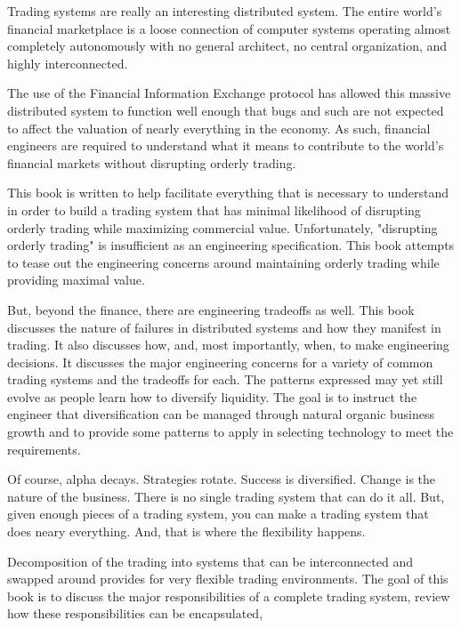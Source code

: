 Trading systems are really an interesting distributed system.  The entire world's
financial marketplace is a loose connection of computer systems operating almost
completely autonomously with no general architect, no central organization, and
highly interconnected.

The use of the Financial Information Exchange protocol has allowed this massive
distributed system to function well enough that bugs and such are not expected
to affect the valuation of nearly everything in the economy.  As such, financial
engineers are required to understand what it means to contribute to the world's
financial markets without disrupting orderly trading.

This book is written to help facilitate everything that is necessary to understand
in order to build a trading system that has minimal likelihood of disrupting orderly
trading while maximizing commercial value. Unfortunately, "disrupting orderly
trading" is insufficient as an engineering specification. This book attempts to tease
out the engineering concerns around maintaining orderly trading while providing
maximal value.

But, beyond the finance, there are engineering tradeoffs as well. This book discusses
the nature of failures in distributed systems and how they manifest in trading. It
also discusses how, and, most importantly, when, to make engineering decisions.
It discusses the major engineering concerns for a variety of common trading systems
and the tradeoffs for each. The patterns expressed may yet still evolve as people
learn how to diversify liquidity.  The goal is to instruct the engineer that 
diversification can be managed through natural organic business growth and to provide
some patterns to apply in selecting technology to meet the requirements.

Of course, alpha decays. Strategies rotate. Success is diversified. Change is the
nature of the business.  There is no single trading system that can do it all.  But,
given enough pieces of a trading system, you can make a trading system that does
neary everything.  And, that is where the flexibility happens.

Decomposition of the trading into systems that can be interconnected and swapped
around provides for very flexible trading environments.  The goal of this book is to
discuss the major responsibilities of a complete trading system, review how these
responsibilities can be encapsulated, 

